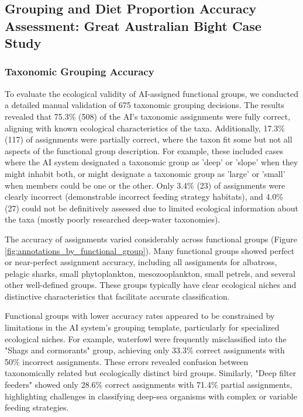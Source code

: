 \subsection{Grouping and Diet Proportion Accuracy Assessment: Great Australian Bight Case Study}

\subsubsection{Taxonomic Grouping Accuracy}
To evaluate the ecological validity of AI-assigned functional groups, we conducted a detailed manual validation of 675 taxonomic grouping decisions. The results revealed that 75.3\% (508) of the AI's taxonomic assignments were fully correct, aligning with known ecological characteristics of the taxa. Additionally, 17.3\% (117) of assignments were partially correct, where the taxon fit some but not all aspects of the functional group description. For example, these included cases where the AI system designated a taxonomic group as 'deep' or 'slope' when they might inhabit both, or might designate a taxonomic group as 'large' or 'small' when members could be one or the other. Only 3.4\% (23) of assignments were clearly incorrect (demonstrable incorrect feeding strategy habitats), and 4.0\% (27) could not be definitively assessed due to limited ecological information about the taxa (mostly poorly researched deep-water taxonomies).

The accuracy of assignments varied considerably across functional groups (Figure \ref{fig:annotations_by_functional_group}). Many functional groups showed perfect or near-perfect assignment accuracy, including all assignments for albatross, pelagic sharks, small phytoplankton, mesozooplankton, small petrels, and several other well-defined groups. These groups typically have clear ecological niches and distinctive characteristics that facilitate accurate classification.

Functional groups with lower accuracy rates appeared to be constrained by limitations in the AI system's grouping template, particularly for specialized ecological niches. For example, waterfowl were frequently misclassified into the "Shags and cormorants" group, achieving only 33.3\% correct assignments with 50\% incorrect assignments. These errors revealed confusion between taxonomically related but ecologically distinct bird groups. Similarly, "Deep filter feeders" showed only 28.6\% correct assignments with 71.4\% partial assignments, highlighting challenges in classifying deep-sea organisms with complex or variable feeding strategies.

